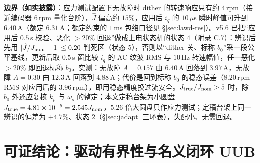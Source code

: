 \documentclass[11pt,a4paper]{article}
\theoremstyle{remark}\newtheorem{remark}{注}
\begin{document}
\textbf{边界（如实披露）}：应力测试配置下无故障时 dither 的转速响应只有约 $4$\,rpm（接近编码器 $6$\,rpm 量化台阶），$\hat J$ 偏高约 $15\%$，应用后 $i_q$ 的 $10$\,$\mu$s 瞬时峰值可升到 $6.40$\,A（额定 $6.31$\,A；额定约束的 $1$\,ms 包络口径见 §\ref{sec:lawd-res}）。v5.6 已把“应用后 $0.5$\,s 校验、恶化 $>20\%$ 回退”做成上电状态机的状态 $4$（附录 C.7）：辨识后先用 $|\hat J/J_{\rm nom}-1|\le0.20$ 判死区（状态 $5$），否则以“dither 关、标称 $b_0$”采一段公平基线，更新后取 $0.5$\,s 窗比较 $i_q$ 的 AC 纹波 RMS 与 $10$\,Hz 转速幅值，任一恶化 $>20\%$ 即回退标称 $b_0$。实测：无故障 $A=0.157$ 由 $6.40$\,A 回落到 $3.97$\,A，无故障 $A=0.30$ 由 $12.3$\,A 回落到 $4.88$\,A；代价是回到标称 $b_0$ 的稳态误差（$8.20$\,rpm RMS 对应用后的 $3.96$\,rpm），即用稳态精度换过流安全。$J_{\rm true}/J_{\rm nom}>5$ 时，除 $b_0$ 外还应复核 $k_p$ 与 $\omega_o$ 的整定；本文定稿台架为小圆盘 $J_{\rm true}=4.81\times10^{-5}=2.545J_{\rm nom}$，$5.26$ 倍大圆盘只作应力测试；定稿台架上同一辨识的偏差为 $+4.7\%$、状态 $2$（§\ref{sec:jadapt} 三环表），失配小、无需回退。

\section{可证结论：驱动有界性与名义闭环 UUB}\label{sec:stab}
\end{document}
